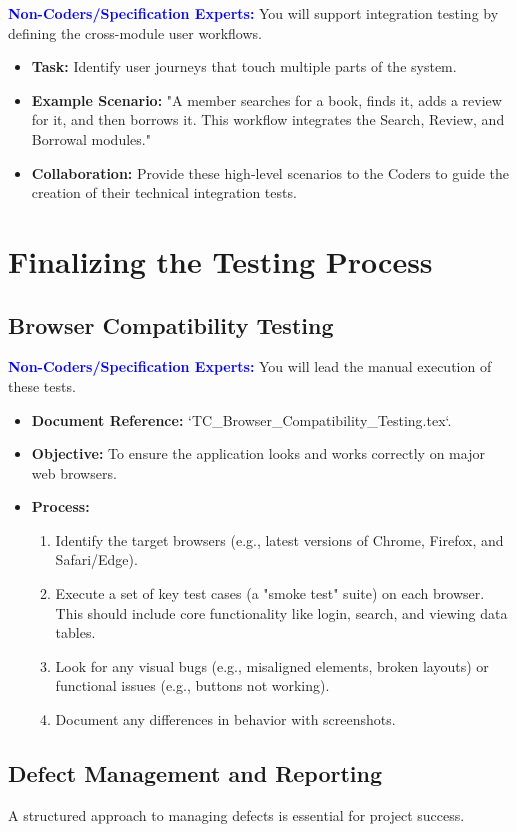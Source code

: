 \documentclass{article}
\newcommand{\role}[1]{\textbf{\textcolor{blue}{#1:}}}
\begin{document}
\role{Non-Coders/Specification Experts}
You will support integration testing by defining the cross-module user workflows.
\begin{itemize}
    \item \textbf{Task:} Identify user journeys that touch multiple parts of the system.
    \item \textbf{Example Scenario:} "A member searches for a book, finds it, adds a review for it, and then borrows it. This workflow integrates the Search, Review, and Borrowal modules."
    \item \textbf{Collaboration:} Provide these high-level scenarios to the Coders to guide the creation of their technical integration tests.
\end{itemize}


\section{Finalizing the Testing Process}

\subsection{Browser Compatibility Testing}
\role{Non-Coders/Specification Experts}
You will lead the manual execution of these tests.
\begin{itemize}
    \item \textbf{Document Reference:} `TC\_Browser\_Compatibility\_Testing.tex`.
    \item \textbf{Objective:} To ensure the application looks and works correctly on major web browsers.
    \item \textbf{Process:}
    \begin{enumerate}
        \item Identify the target browsers (e.g., latest versions of Chrome, Firefox, and Safari/Edge).
        \item Execute a set of key test cases (a "smoke test" suite) on each browser. This should include core functionality like login, search, and viewing data tables.
        \item Look for any visual bugs (e.g., misaligned elements, broken layouts) or functional issues (e.g., buttons not working).
        \item Document any differences in behavior with screenshots.
    \end{enumerate}
\end{itemize}

\subsection{Defect Management and Reporting}
A structured approach to managing defects is essential for project success.
\end{document}
